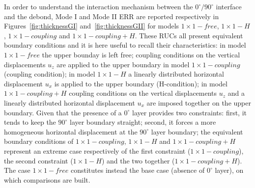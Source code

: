 \documentclass[Review,sagev,times]{sagej}
\begin{document}
In order to understand the interaction mechanism between the $0^{\circ}/90^{\circ}$ interface and the debond, Mode I and Mode II ERR are reported respectively in Figures~\ref{fig:thicknessGI} and~\ref{fig:thicknessGII} for models $1\times 1-free$, $1\times 1-H$, $1\times 1-coupling$ and $1\times 1-coupling+H$. These RUCs all present equivalent boundary conditions and it is here useful to recall their characteristics: in model $1\times 1-free$ the upper bounday is left free; coupling conditions on the vertical displacements $u_{z}$ are applied to the upper boundary in model $1\times 1-coupling$ (coupling condition); in model $1\times 1-H$ a linearly distributed horizontal displacement $u_{x}$ is applied to the upper boundary (H-condition); in model $1\times 1-coupling+H$ coupling conditions on the vertical displacements $u_{z}$ and a linearly distributed horizontal displacement $u_{x}$ are imposed together on the upper boundary. Given that the presence of a $0^{\circ}$ layer provides two constraints: first, it tends to keep the $90^{\circ}$ layer boundary straight; second, it forces a more homogeneous horizontal displacement at the $90^{\circ}$ layer boundary; the equivalent boundary conditions of $1\times 1-coupling$, $1\times 1-H$ and $1\times 1-coupling+H$ represent an extreme case respectively of the first constraint ($1\times 1-coupling$), the second constraint ($1\times 1-H$) and the two together ($1\times 1-coupling+H$). The case $1\times 1-free$ constitutes instead the base case (absence of $0^{\circ}$ layer), on which comparisons are built.\\
\end{document}
